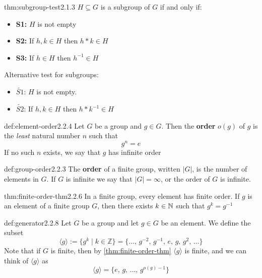 \documentclass[landscape, 8pt]{extarticle}
\begin{document}
\begin{multicols}{3}
\begin{thm}{thm:subgroup-test}{2.1.3}
    $H\subseteq G$ is a subgroup of $G$ if and only if:
    \renewcommand\labelitemi{\tiny$\bullet$}
    \begin{itemize}
        \setlength\itemsep{0em}
        \item \textbf{S1:} $H$ is not empty
        \item \textbf{S2:} If $h,k\in H$ then $h\ast k\in H$
        \item \textbf{S3:} If $h\in H$ then $h^{-1}\in H$
    \end{itemize}
    Alternative test for subgroups:
    \renewcommand\labelitemi{\tiny$\bullet$}
    \begin{itemize}
        \setlength\itemsep{0em}
        \item $\widetilde{S1}$: $H$ is not empty.
        \item $\widetilde{S2}$: If $h,k\in H$ then $h*k^{-1}\in H$
    \end{itemize}
\end{thm}
\vspace{-5pt}

\begin{dfn}{def:element-order}{2.2.4}
    Let $G$ be a group and $g\in G$. Then the \textbf{order} $o(g)$ of $g$ is the \textit{least} natural number $n$ such that
    $$g^n = e$$
    If no such $n$ exists, we say that $g$ has infinite order
\end{dfn}
\vspace{-5pt}

\begin{dfn}{def:group-order}{2.2.3}
    The \textbf{order} of a finite group, written $\lvert G \rvert$, is the number of elements in $G$.
    If $G$ is infinite we say that $\lvert G \rvert = \infty$, or the order of $G$ is infinite.
\end{dfn}
\vspace{-5pt}

\begin{thm}{thm:finite-order-thm}{2.2.6}
    In a finite group, every element has finite order.\newline
    If $g$ is an element of a finite group $G$, then there exists $k\in \mathbb{N}$ such that $g^{k} = g^{-1}$
\end{thm}
\vspace{-5pt}

\begin{dfn}{def:generator}{2.2.8}
    Let $G$ be a group and let $g\in G$ be an element. We define the subset
    $$\langle g \rangle := \{g^k \mid k\in\mathbb{Z}\} = \{\dots,\,g^{-2},\,g^{-1},\,e,\,g,\,g^{2},\,\dots \}$$
    Note that if $G$ is finite, then by \ref{thm:finite-order-thm} $\langle g \rangle$ is finite, and we can think of $\langle g \rangle$ as
    $$\langle g \rangle = \{e,\,g,\,\dots,\,g^{o(g)-1}\}$$
\end{dfn}
\vspace{-5pt}


\end{multicols}
\end{document}
